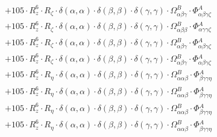 \documentclass{article}
\begin{document}
\begin{subequations}
\begin{gather}
\begin{array}{c}
 \\[0.2em] 		 + 105 \cdot R_{z}^{6} \cdot R_{\zeta{}} \cdot \delta{}\left(\alpha{}, \alpha{}\right) \cdot \delta{}\left(\beta{}, \beta{}\right) \cdot \delta{}\left(\gamma{}, \gamma{}\right) \cdot \Omega{}^{B}_{\alpha{}\beta{}\gamma{}} \cdot \Phi{}^{A}_{\alpha{}\beta{}\gamma{}\zeta{}} 
 \\[0.2em] 		 + 105 \cdot R_{z}^{6} \cdot R_{\zeta{}} \cdot \delta{}\left(\alpha{}, \alpha{}\right) \cdot \delta{}\left(\beta{}, \beta{}\right) \cdot \delta{}\left(\gamma{}, \gamma{}\right) \cdot \Omega{}^{B}_{\alpha{}\beta{}\beta{}} \cdot \Phi{}^{A}_{\alpha{}\gamma{}\gamma{}\zeta{}} 
 \\[0.2em] 		 + 105 \cdot R_{z}^{6} \cdot R_{\zeta{}} \cdot \delta{}\left(\alpha{}, \alpha{}\right) \cdot \delta{}\left(\beta{}, \beta{}\right) \cdot \delta{}\left(\gamma{}, \gamma{}\right) \cdot \Omega{}^{B}_{\alpha{}\beta{}\gamma{}} \cdot \Phi{}^{A}_{\alpha{}\beta{}\gamma{}\zeta{}} 
 \\[0.2em] 		 + 105 \cdot R_{z}^{6} \cdot R_{\zeta{}} \cdot \delta{}\left(\alpha{}, \alpha{}\right) \cdot \delta{}\left(\beta{}, \beta{}\right) \cdot \delta{}\left(\gamma{}, \gamma{}\right) \cdot \Omega{}^{B}_{\alpha{}\beta{}\gamma{}} \cdot \Phi{}^{A}_{\alpha{}\beta{}\gamma{}\zeta{}} 
 \\[0.2em] 		 + 105 \cdot R_{z}^{6} \cdot R_{\eta{}} \cdot \delta{}\left(\alpha{}, \alpha{}\right) \cdot \delta{}\left(\beta{}, \beta{}\right) \cdot \delta{}\left(\gamma{}, \gamma{}\right) \cdot \Omega{}^{B}_{\alpha{}\alpha{}\beta{}} \cdot \Phi{}^{A}_{\beta{}\gamma{}\gamma{}\eta{}} 
 \\[0.2em] 		 + 105 \cdot R_{z}^{6} \cdot R_{\eta{}} \cdot \delta{}\left(\alpha{}, \alpha{}\right) \cdot \delta{}\left(\beta{}, \beta{}\right) \cdot \delta{}\left(\gamma{}, \gamma{}\right) \cdot \Omega{}^{B}_{\alpha{}\alpha{}\beta{}} \cdot \Phi{}^{A}_{\beta{}\gamma{}\gamma{}\eta{}} 
 \\[0.2em] 		 + 105 \cdot R_{z}^{6} \cdot R_{\eta{}} \cdot \delta{}\left(\alpha{}, \alpha{}\right) \cdot \delta{}\left(\beta{}, \beta{}\right) \cdot \delta{}\left(\gamma{}, \gamma{}\right) \cdot \Omega{}^{B}_{\alpha{}\alpha{}\beta{}} \cdot \Phi{}^{A}_{\beta{}\gamma{}\gamma{}\eta{}} 
 \\[0.2em] 		 + 105 \cdot R_{z}^{6} \cdot R_{\eta{}} \cdot \delta{}\left(\alpha{}, \alpha{}\right) \cdot \delta{}\left(\beta{}, \beta{}\right) \cdot \delta{}\left(\gamma{}, \gamma{}\right) \cdot \Omega{}^{B}_{\alpha{}\alpha{}\beta{}} \cdot \Phi{}^{A}_{\beta{}\gamma{}\gamma{}\eta{}} 

\end{array}
\end{gather}
\end{subequations}
\end{document}
